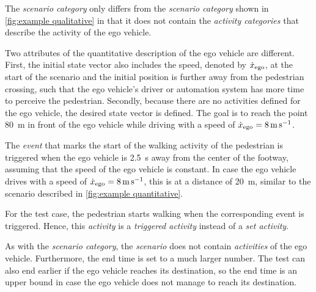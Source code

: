 
The \textit{scenario category} only differs from the \textit{scenario category} shown in \cref{fig:example qualitative} in that it does not contain the \textit{activity categories} that describe the activity of the ego vehicle.

Two attributes of the quantitative description of the ego vehicle are different. First, the initial state \cstart vector \cend also includes the speed, denoted by $\dot{x}_{\mathrm{ego}}$, at the start of the scenario and the initial position is further away from the pedestrian crossing, such that the ego vehicle's driver or automation system has more time to perceive the pedestrian. 
Secondly, because there are no activities defined for the ego vehicle, the desired \cstart state vector is \cend defined. The goal is to reach the point \SI{80}{\meter} in front of the ego vehicle while driving with a speed of $\dot{x}_{\mathrm{ego}}=\SI{8}{\meter\per\second}$.

The \textit{event} that marks the start of the walking activity of the pedestrian is triggered when the ego vehicle is \SI{2.5}{\second} away from the center of the footway, assuming that the speed of the ego vehicle is constant. In case the ego vehicle drives with a speed of $\dot{x}_{\mathrm{ego}}=\SI{8}{\meter\per\second}$, this is at a distance of \SI{20}{\meter}, similar to the scenario described in \cref{fig:example quantitative}.

For the test case, the pedestrian starts walking when the corresponding event is triggered. Hence, this \textit{activity} is a \textit{triggered activity} instead of a \textit{set activity}.

As with the \textit{scenario category}, the \textit{scenario} does not contain \textit{activities} of the ego vehicle. Furthermore, the end time is set to a much larger number. The test can also end earlier if the ego vehicle reaches its destination, so the end time is an upper bound in case the ego vehicle does not manage to reach its destination.


